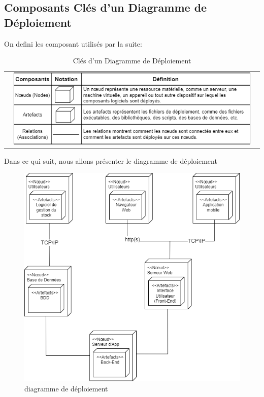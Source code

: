 \documentclass[edit,12pt,a4paper,ChapStyle,oneside,doubleinterligne]{report}
\begin{document}
\subsection{Composants Clés d'un Diagramme de Déploiement}
On defini les composant utilisés par la suite:
\begin{table}[h!]
    \centering
    \begin{tabular}{c}
        \centering
        \includegraphics[width=0.95\textwidth]{images/deploiment.png}
    \end{tabular}
    \caption{Clés d'un Diagramme de Déploiement}
    \label{tab:dep}
\end{table}
\newline Dans ce qui suit, nous allons présenter le diagramme de déploiement
\begin{figure} [H]
    \centering
    \includegraphics[width=1\textwidth]{images/diag dep.png}
    \caption{diagramme de déploiement}
    \label{fig:ddb}
\end{figure}
\end{document}
